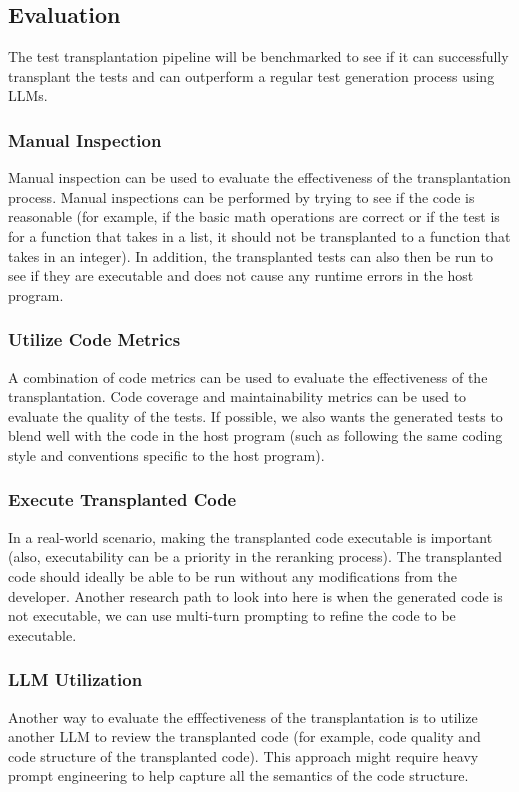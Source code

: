 \documentclass[sigconf]{acmart}
\begin{document}
\subsection{Evaluation}
The test transplantation pipeline will be benchmarked to see if it can successfully transplant the tests and can outperform a regular test generation process using LLMs.

\subsubsection{Manual Inspection}\label{sec:manual-inspection}
Manual inspection can be used to evaluate the effectiveness of the transplantation process. 
%
Manual inspections can be performed by trying to see if the code is reasonable (for example, if the basic math operations are correct or if the test is for a function that takes in a list, it should not be transplanted to a function that takes in an integer).
%
In addition, the transplanted tests can also then be run to see if they are executable and does not cause any runtime errors in the host program.

\subsubsection{Utilize Code Metrics}\label{sec:utilize-code-metrics}
A combination of code metrics can be used to evaluate the effectiveness of the transplantation.
%
Code coverage and maintainability metrics can be used to evaluate the quality of the tests.
%
If possible, we also wants the generated tests to blend well with the code in the host program (such as following the same coding style and conventions specific to the host program).

\subsubsection{Execute Transplanted Code}\label{sec:execute-transplanted-code}
In a real-world scenario, making the transplanted code executable is important (also, executability can be a priority in the reranking process).
%
The transplanted code should ideally be able to be run without any modifications from the developer.
%
Another research path to look into here is when the generated code is not executable, we can use multi-turn prompting to refine the code to be executable.

\subsubsection{LLM Utilization}\label{sec:llm-utilization}
Another way to evaluate the efffectiveness of the transplantation is to utilize another LLM to review the transplanted code (for example, code quality and code structure of the transplanted code).
%
This approach might require heavy prompt engineering to help capture all the semantics of the code structure.



\end{document}
